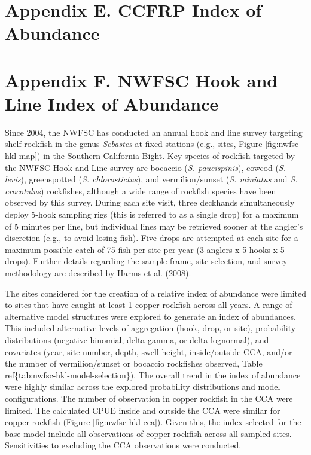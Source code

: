 \documentclass[11pt,
  english,
  letterpaper,
]{article}
\begin{document}
\hypertarget{ccfrp-index}{%
\section{Appendix E. CCFRP Index of Abundance}\label{ccfrp-index}}

\hypertarget{nwfsc-hkl-model}{%
\section{Appendix F. NWFSC Hook and Line Index of Abundance}\label{nwfsc-hkl-model}}

Since 2004, the NWFSC has conducted an annual hook and line survey targeting shelf rockfish in the genus \emph{Sebastes} at fixed stations (e.g., sites, Figure \ref{fig:nwfsc-hkl-map}) in the Southern California Bight. Key species of rockfish targeted by the NWFSC Hook and Line survey are bocaccio (\emph{S. paucispinis}), cowcod (\emph{S. levis}), greenspotted (\emph{S. chlorostictus}), and vermilion/sunset (\emph{S. miniatus} and \emph{S. crocotulus}) rockfishes, although a wide range of rockfish species have been observed by this survey. During each site visit, three deckhands simultaneously deploy 5-hook sampling rigs (this is referred to as a single drop) for a maximum of 5 minutes per line, but individual lines may be retrieved sooner at the angler's discretion (e.g., to avoid losing fish). Five drops are attempted at each site for a maximum possible catch of 75 fish per site per year (3 anglers x 5 hooks x 5 drops). Further details regarding the sample frame, site selection, and survey methodology are described by Harms et al. (2008).

The sites considered for the creation of a relative index of abundance were limited to sites that have caught at least 1 copper rockfish across all years. A range of alternative model structures were explored to generate an index of abundances. This included alternative levels of aggregation (hook, drop, or site), probability distributions (negative binomial, delta-gamma, or delta-lognormal), and covariates (year, site number, depth, swell height, inside/outside CCA, and/or the number of vermilion/sunset or bocaccio rockfishes observed, Table ref\{tab:nwfsc-hkl-model-selection\}). The overall trend in the index of abundance were highly similar across the explored probability distributions and model configurations. The number of observation in copper rockfish in the CCA were limited. The calculated CPUE inside and outside the CCA were similar for copper rockfish (Figure \ref{fig:nwfsc-hkl-cca}). Given this, the index selected for the base model include all observations of copper rockfish across all sampled sites. Sensitivities to excluding the CCA observations were conducted.
\end{document}
